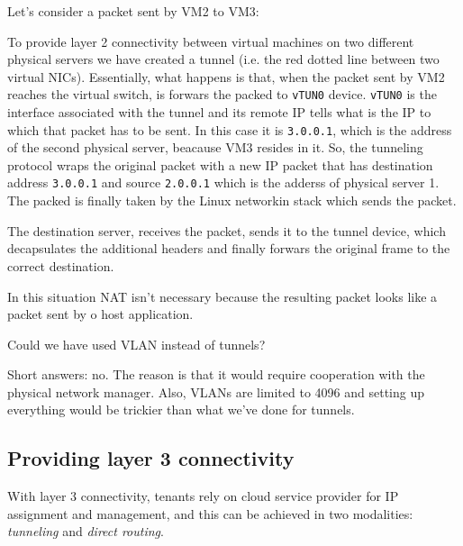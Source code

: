 \begin{eg}
    Let's consider a packet sent by VM2 to VM3:

    \begin{figure}[h!]
        \centering
    \end{figure}

    \noindent
    To provide layer 2 connectivity between virtual machines on two different
    physical servers we have created a tunnel (i.e. the red dotted line between
    two virtual NICs). Essentially, what happens is that, when the packet sent
    by VM2 reaches the virtual switch, is forwars the packed to \texttt{vTUN0}
    device. \texttt{vTUN0} is the interface associated with the tunnel and its
    remote IP tells what is the IP to which that packet has to be sent. In this
    case it is \texttt{3.0.0.1}, which is the address of the second physical
    server, beacause VM3 resides in it. So, the tunneling protocol wraps the
    original packet with a new IP packet that has destination address
    \texttt{3.0.0.1} and source \texttt{2.0.0.1} which is the adderss of physical
    server 1. The packed is finally taken by the Linux networkin stack which
    sends the packet.

    The destination server, receives the packet, sends it to the tunnel
    device, which decapsulates the additional headers and finally forwars the
    original frame to the correct destination.
\end{eg}
\begin{note}
    In this situation NAT isn't necessary because the resulting packet looks
    like a packet sent by o host application.
\end{note}

\noindent
Could we have used VLAN instead of tunnels?

Short answers: no. The reason is that it would require cooperation with the
physical network manager. Also, VLANs are limited to 4096 and setting up
everything would be trickier than what we've done for tunnels.

\subsection{Providing layer 3 connectivity}
With layer 3 connectivity, tenants rely on cloud service provider for IP
assignment and management, and this can be achieved in two modalities:
\emph{tunneling} and \emph{direct routing}.

